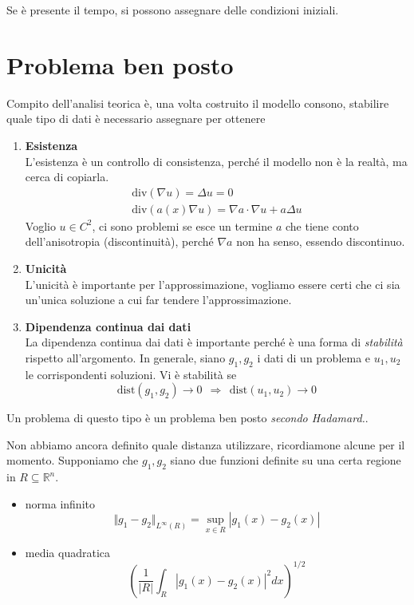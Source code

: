 \documentclass[10pt,a4paper,twoside,openright]{book}
\begin{document}
Se è presente il tempo, si possono assegnare delle condizioni iniziali.
\section{Problema ben posto}

Compito dell'analisi teorica è, una volta costruito il modello consono, stabilire quale tipo di dati è necessario assegnare per ottenere
\begin{enumerate}
	\item \textbf{Esistenza}\\
	L'esistenza è un controllo di consistenza, perché il modello non è la realtà, ma cerca di copiarla.
	\begin{gather*}
		\mathrm{div}(\nabla u) =\Delta u=0\\
		\mathrm{div}(a(x) \nabla u) =\nabla a\cdotp \nabla u+a\Delta u
	\end{gather*}
	Voglio $u\in C^{2}$, ci sono problemi se esce un termine $a$ che tiene conto dell'anisotropia (discontinuità), perché $\nabla a$ non ha senso, essendo discontinuo.

	\item \textbf{Unicità}\\
	L'unicità è importante per l'approssimazione, vogliamo essere certi che ci sia un'unica soluzione a cui far tendere l'approssimazione.

	\item \textbf{Dipendenza continua dai dati}\\
	La dipendenza continua dai dati è importante perché è una forma di \textit{stabilità} rispetto all'argomento. In generale, siano $g_{1},g_{2}$ i dati di un problema e $u_{1},u_{2}$ le corrispondenti soluzioni. Vi è stabilità se
	\begin{equation*}
		\text{dist}(g_{1},g_{2})\rightarrow 0\ \ \Rightarrow \ \ \text{dist}(u_{1},u_{2})\rightarrow 0
	\end{equation*}
\end{enumerate}

Un problema di questo tipo è un problema ben posto \textit{secondo Hadamard.}.

Non abbiamo ancora definito quale distanza utilizzare, ricordiamone alcune per il momento. Supponiamo che $g_{1},g_{2}$ siano due funzioni definite su una certa regione in $R\subseteq \mathbb{R}^{n}$.
\begin{itemize}
\item norma infinito\begin{equation*}
\Vert g_{1} -g_{2}\Vert _{L^{\infty }(R)} =\sup _{x\in R}| g_{1}(x) -g_{2}(x)| 
\end{equation*}
\item media quadratica\begin{equation*}
\left(\frac{1}{| R| }\int _{R}| g_{1}(x) -g_{2}(x)| ^{2} dx\right)^{1/2}
\end{equation*}
\end{itemize}
\end{document}
